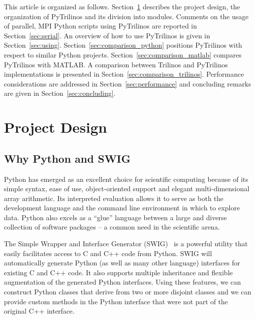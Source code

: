 \documentclass[acmtocl]{acmtrans2m}
\begin{document}
\smallskip

This article is organized as follows. Section~\ref{sec:design}
describes the project design, the organization of PyTrilinos and its
division into modules. Comments on the usage of parallel, MPI Python
scripts using PyTrilinos are reported in Section~\ref{sec:serial}.  An
overview of how to use PyTrilinos is given in Section~\ref{sec:using}.
Section~\ref{sec:comparison_python} positions PyTrilinos with respect
to similar Python projects.  Section~\ref{sec:comparison_matlab}
compares PyTrilinos with MATLAB.  A comparison between Trilinos and
PyTrilinos implementations is presented in
Section~\ref{sec:comparison_trilinos}.  Performance considerations are
addressed in Section~\ref{sec:performance} and concluding remarks are
given in Section~\ref{sec:concluding}.

\section{Project Design}
\label{sec:design}

\subsection{Why Python and SWIG}
\label{sec:why}

Python has emerged as an excellent choice for scientific computing
because of its simple syntax, ease of use, object-oriented support and
elegant multi-dimensional array arithmetic. Its interpreted evaluation
allows it to serve as both the development language and the command
line environment in which to explore data. Python also excels as a
``glue'' language between a large and diverse collection of software
packages -- a common need in the scientific arena.

The Simple Wrapper and Interface Generator (SWIG)~\cite{swig} is a
powerful utility that easily facilitates access to C and C++ code from
Python.  SWIG will automatically generate Python (as well as many
other language) interfaces for existing C and C++ code.  It also
supports multiple inheritance and flexible augmentation of the
generated Python interfaces.  Using these features, we can construct
Python classes that derive from two or more disjoint classes and we
can provide custom methods in the Python interface that were not part
of the original C++ interface.
\end{document}
